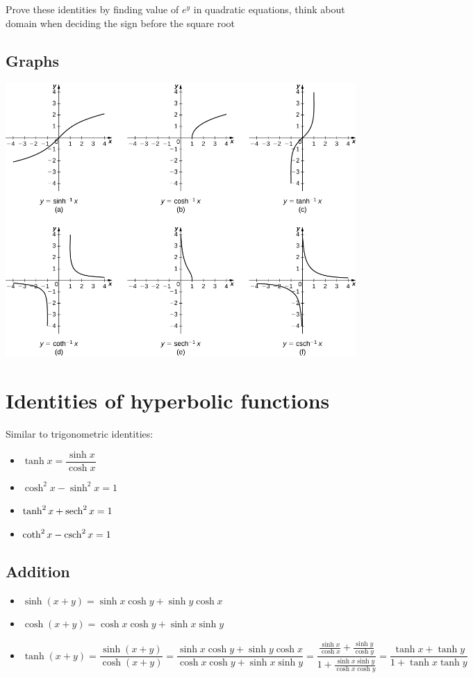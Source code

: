 \begin{remark}
	Prove these identities by finding value of $e^y$ in quadratic equations, think about domain when deciding the sign before the square root
\end{remark}

\subsection{Graphs}
\includegraphics[width=\linewidth]{images/hyperbolic_inverse_graphs}



\section{Identities of hyperbolic functions}
Similar to trigonometric identities:
\begin{itemize}
	\item $\tanh x = \dfrac{\sinh x}{\cosh x}$
	\item $\cosh^2 x - \sinh^2 x = 1$
	\item $\tanh^2 x + \operatorname{sech}^2 x= 1$
	\item $\coth^2 x - \operatorname{csch}^2 x = 1$
\end{itemize}

\subsection{Addition}
\begin{itemize}
	\item $\sinh(x+y)=\sinh x \cosh y + \sinh y \cosh x$
	\item $\cosh(x+y)=\cosh x \cosh y + \sinh x \sinh y$
	\item $\tanh(x+y) = \dfrac{\sinh(x+y)}{\cosh(x+y)} = \dfrac{\sinh x \cosh y + \sinh y \cosh x}{\cosh x \cosh y + \sinh x \sinh y} = \dfrac{\frac{\sinh x}{\cosh x}+\frac{\sinh y}{\cosh y}}{1 + \frac{\sinh x \sinh y}{\cosh x \cosh y}}=\dfrac{\tanh x + \tanh y}{1 + \tanh x \tanh y}$
\end{itemize}

